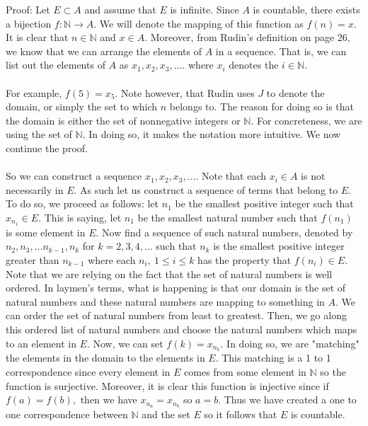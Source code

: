 \documentclass[12pt]{article}
\begin{document}
Proof: Let $E \subset A$ and assume that $E$ is infinite. Since $A$ is countable, there exists a bijection $f: \mathbb{N} \rightarrow A$. We will denote the mapping of this function as $f(n)=x$. It is clear that $n \in \mathbb{N}$ and $x \in A$. Moreover, from Rudin's definition on page 26, we know that we can arrange the elements of $A$ in a sequence. That is, we can list out the elements of $A$ as $x_{1}, x_{2}, x_{3}, \ldots$. where $x_{i}$ denotes the $i \in \mathbb{N}$. \\ \\
For example, $f(5)=x_{5}$. Note however, that Rudin uses $J$ to denote the domain, or simply the set to which $n$ belongs to. The reason for doing so is that the domain is either the set of nonnegative integers or $\mathbb{N}$. For concreteness, we are using the set of $\mathbb{N}$. In doing so, it makes the notation more intuitive. We now continue the proof. \\ \\
So we can construct a sequence $x_{1}, x_{2}, x_{3}, \ldots$. Note that each $x_{i} \in A$ is not necessarily in $E$. As such let us construct a sequence of terms that belong to $E$. To do so, we proceed as follows: let $n_{1}$ be the smallest positive integer such that $x_{n_{1}} \in E.$ This is saying, let $n_{1}$ be the smallest natural number such that $f(n_{1})$ is some element in $E$. Now find a sequence of such natural numbers, denoted by $n_{2}, n_{3}, \ldots n_{k-1}, n_{k}$ for $k=2, 3, 4, \ldots$ such that $n_{k}$ is the smallest positive integer greater than $n_{k-1}$ where each $n_{i},~1 \leq i \leq k$ has the property that $f(n_{i}) \in E$. Note that we are relying on the fact that the set of natural numbers is well ordered. In laymen's terms, what is happening is that our domain is the set of natural numbers and these natural numbers are mapping to something in $A$. We can order the set of natural numbers from least to greatest. Then, we go along this ordered list of natural numbers and choose the natural numbers which maps to an element in $E$. Now, we can set $f(k)= x_{n_{k}}$. In doing so, we are "matching" the elements in the domain to the elements in $E$. This matching is a 1 to 1 correspondence since every element in $E$ comes from some element in $\mathbb{N}$ so the function is surjective. Moreover, it is clear this function is injective since if $f(a)=f(b),$ then we have $x_{n_{a}}=x_{n_{b}}$ so $a=b$. Thus we have created a one to one correspondence between $\mathbb{N}$ and the set $E$ so it follows that $E$ is countable. \\ \\
\end{document}
